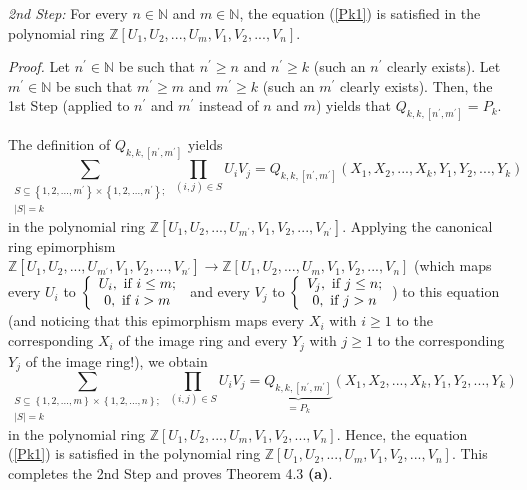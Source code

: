 \documentclass[numbers=enddot,12pt,final,onecolumn,notitlepage]{scrartcl}%
\begin{document}
\textit{2nd Step:} For every $n\in\mathbb{N}$ and $m\in\mathbb{N}$, the
equation (\ref{Pk1}) is satisfied in the polynomial ring $\mathbb{Z}\left[
U_{1},U_{2},...,U_{m},V_{1},V_{2},...,V_{n}\right]  $.

\textit{Proof.} Let $n^{\prime}\in\mathbb{N}$ be such that $n^{\prime}\geq n$
and $n^{\prime}\geq k$ (such an $n^{\prime}$ clearly exists). Let $m^{\prime
}\in\mathbb{N}$ be such that $m^{\prime}\geq m$ and $m^{\prime}\geq k$ (such
an $m^{\prime}$ clearly exists). Then, the 1st Step (applied to $n^{\prime}$
and $m^{\prime}$ instead of $n$ and $m$) yields that $Q_{k,k,\left[
n^{\prime},m^{\prime}\right]  }=P_{k}.$

The definition of $Q_{k,k,\left[  n^{\prime},m^{\prime}\right]  }$ yields
\[
\sum_{\substack{S\subseteq\left\{  1,2,...,m^{\prime}\right\}  \times\left\{
1,2,...,n^{\prime}\right\}  ;\\\left\vert S\right\vert =k}}\prod_{\left(
i,j\right)  \in S}U_{i}V_{j}=Q_{k,k,\left[  n^{\prime},m^{\prime}\right]
}\left(  X_{1},X_{2},...,X_{k},Y_{1},Y_{2},...,Y_{k}\right)
\]
in the polynomial ring $\mathbb{Z}\left[  U_{1},U_{2},...,U_{m^{\prime}}%
,V_{1},V_{2},...,V_{n^{\prime}}\right]  $. Applying the canonical ring
epimorphism $\mathbb{Z}\left[  U_{1},U_{2},...,U_{m^{\prime}},V_{1}%
,V_{2},...,V_{n^{\prime}}\right]  \rightarrow\mathbb{Z}\left[  U_{1}%
,U_{2},...,U_{m},V_{1},V_{2},...,V_{n}\right]  $ (which maps every $U_{i}$ to
$\left\{
\begin{array}
[c]{c}%
U_{i},\text{ if }i\leq m;\\
0,\text{ if }i>m
\end{array}
\right.  $ and every $V_{j}$ to $\left\{
\begin{array}
[c]{c}%
V_{j},\text{ if }j\leq n;\\
0,\text{ if }j>n
\end{array}
\right.  $) to this equation (and noticing that this epimorphism maps every
$X_{i}$ with $i\geq1$ to the corresponding $X_{i}$ of the image ring and every
$Y_{j}$ with $j\geq1$ to the corresponding $Y_{j}$ of the image ring!), we
obtain%
\[
\sum_{\substack{S\subseteq\left\{  1,2,...,m\right\}  \times\left\{
1,2,...,n\right\}  ;\\\left\vert S\right\vert =k}}\prod_{\left(  i,j\right)
\in S}U_{i}V_{j}=\underbrace{Q_{k,k,\left[  n^{\prime},m^{\prime}\right]  }%
}_{=P_{k}}\left(  X_{1},X_{2},...,X_{k},Y_{1},Y_{2},...,Y_{k}\right)
\]
in the polynomial ring $\mathbb{Z}\left[  U_{1},U_{2},...,U_{m},V_{1}%
,V_{2},...,V_{n}\right]  $. Hence, the equation (\ref{Pk1}) is satisfied in
the polynomial ring $\mathbb{Z}\left[  U_{1},U_{2},...,U_{m},V_{1}%
,V_{2},...,V_{n}\right]  .$ This completes the 2nd Step and proves Theorem 4.3
\textbf{(a)}.
\end{document}
